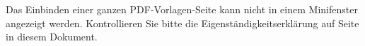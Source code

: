 
Das Einbinden einer ganzen PDF-Vorlagen-Seite kann nicht in einem Minifenster angezeigt werden. Kontrollieren Sie bitte die  Eigenständigkeitserklärung auf Seite \pageref{eigenstaendigkeitserklaerung} in diesem Dokument.
